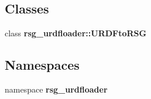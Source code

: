 \subsection*{\-Classes}
\begin{DoxyCompactItemize}
\item 
class {\bf rsg\-\_\-urdfloader\-::\-U\-R\-D\-Fto\-R\-S\-G}
\end{DoxyCompactItemize}
\subsection*{\-Namespaces}
\begin{DoxyCompactItemize}
\item 
namespace {\bf rsg\-\_\-urdfloader}
\end{DoxyCompactItemize}
